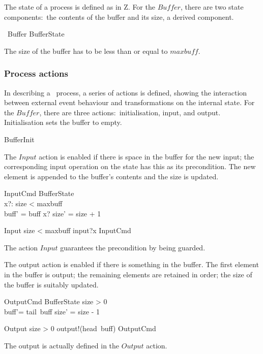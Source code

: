 \documentclass{article}
\begin{document}
The state of a process is defined as in Z.  For the $Buffer$, there
are two state components:~the contents of the buffer and its size, a
derived component.

\begin{zed}
  \circprocess\ Buffer  \circbegin
  \also %
  BufferState 
\end{zed}
The size of the buffer has to be less than or equal to $maxbuff$.

\subsubsection{Process actions}

In describing a \Circus\ process, a series of actions is defined,
showing the interaction between external event behaviour and
transformations on the internal state.  For the $Buffer$, there are
three actions:~initialisation, input, and output.  Initialisation sets
the buffer to empty.
\begin{zed}
  BufferInit 
\end{zed}
The $Input$ action is enabled if there is space in the buffer for the
new input; the corresponding input operation on the state has this as
its precondition.  The new element is appended to the buffer's
contents and the size is updated.
\begin{schema}{InputCmd}
  \Delta BufferState
  \\ %
  x?: \nat
  \where %
  size < maxbuff
  \\ %
  buff' = buff \cat \langle x? \rangle \land size' = size + 1
\end{schema}
\begin{zed}
  Input  size < maxbuff \guard input?x \then InputCmd
\end{zed}
The action $Input$ guarantees the precondition by being guarded.

The output action is enabled if there is something in the buffer.  The
first element in the buffer is output; the remaining elements are
retained in order; the size of the buffer is suitably updated.
\begin{schema}{OutputCmd}
  \Delta BufferState
  \where %
  size > 0
  \\ %
  buff'= tail~buff \land size' = size - 1
\end{schema}
\begin{zed}
  Output  size > 0 \guard output!(head~buff) \then OutputCmd
\end{zed}
The output is actually defined in the $Output$ action.
\end{document}
